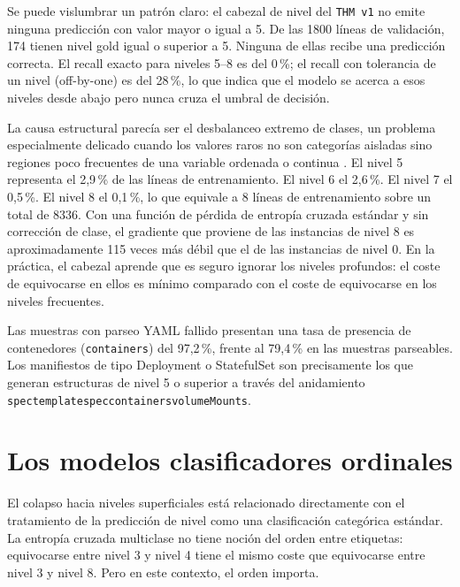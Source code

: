 Se puede vislumbrar un patrón claro: el cabezal de nivel del \texttt{THM v1} no emite ninguna predicción con valor mayor o igual a 5. De las 1800 líneas de validación, 174 tienen nivel
gold igual o superior a 5. Ninguna de ellas recibe una predicción correcta. El recall exacto para niveles 5--8 es del 0\,\%; el recall con tolerancia de un nivel (off-by-one) es del
28\,\%, lo que indica que el modelo se acerca a esos niveles desde abajo pero nunca cruza el umbral de decisión.

La causa estructural parecía ser el desbalanceo extremo de clases, un problema especialmente delicado cuando los valores raros no son categorías aisladas sino regiones poco frecuentes
de una variable ordenada o continua \citep{yang2021imbalancedRegression, steininger2021density}. El nivel 5 representa el 2,9\,\% de las líneas de entrenamiento. El nivel 6 el 2,6\,\%. El nivel 7 el 0,5\,\%. El nivel 8
el 0,1\,\%, lo que equivale a 8 líneas de entrenamiento sobre un total de 8336. Con una función de pérdida de entropía cruzada estándar y sin corrección de clase, el gradiente que
proviene de las instancias de nivel 8 es aproximadamente 115 veces más débil que el de las instancias de nivel 0. En la práctica, el cabezal aprende que es seguro ignorar los niveles
profundos: el coste de equivocarse en ellos es mínimo comparado con el coste de equivocarse en los niveles frecuentes.

Las muestras con parseo YAML fallido presentan una tasa de presencia de contenedores (\texttt{containers}) del 97,2\,\%,
frente al 79,4\,\% en las muestras parseables. Los manifiestos de tipo Deployment o StatefulSet son precisamente los que generan estructuras de nivel 5 o superior a través del
anidamiento \texttt{spec\textrightarrow{}template\textrightarrow{}spec\textrightarrow{}containers\textrightarrow{}volumeMounts}.


\section{Los modelos clasificadores ordinales}
\label{sec:ch6_ordinal}

El colapso hacia niveles superficiales está relacionado directamente con el tratamiento de la predicción de nivel como una clasificación categórica estándar. La entropía cruzada
multiclase no tiene noción del orden entre etiquetas: equivocarse entre nivel 3 y nivel 4 tiene el mismo coste que equivocarse entre nivel 3 y nivel 8. Pero en este contexto,
el orden importa.

